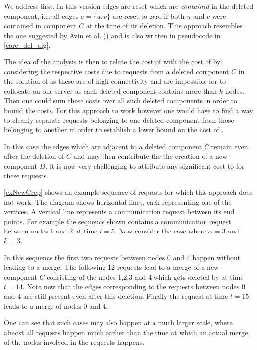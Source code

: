 \documentclass[a4paper,xcolor=dvipsnames, tikz, 12pt]{article}
\newcommand{\opt}{\text{O{\scriptsize PT}}}
\newcommand{\coreDel}{\text{C{\scriptsize ORE}-D{\scriptsize EL}}}
\theoremstyle{definition}
\begin{document}
	 We address \coreDel{} first. In this version edges are reset which are \textit{contained} in the deleted component, i.e. all edges $e=\{u,v\}$ are reset to zero if both $u$ and $v$ were contained in component $C$ at the time of its deletion. This approach resembles the one suggested by Avin et al. (\cite{Avin2015}) and is also written in pseudocode in \cref{core_del_alg}.
	 
	 The idea of the analysis is then to relate the cost of \coreDel{} with the cost of \opt{} by considering the respective costs due to requests from a deleted component $C$ in the solution of \coreDel{} as these are of high connectivity and are impossible for \opt{} to collocate on one server as each deleted component contains more than $k$ nodes. Then one could sum these costs over all such deleted components in order to bound the costs. For this approach to work however one would have to find a way to cleanly separate requests belonging to one deleted component from those belonging to another in order to establish a lower bound on the cost of \opt{}.
	 
	 In this case the edges which are adjacent to a deleted component $C$ remain even after the deletion of $C$ and may then contribute the the creation of a new component $D$. It is now very challenging to attribute any significant cost to \opt{} for these requests.
	 
	 \cref{exNewCrep} shows an example sequence of requests for which this approach does not work. The diagram shows horizontal lines, each representing one of the vertices. A vertical line represents a communication request between its end points. For example the sequence shown contains a communication request between nodes 1 and 2 at time $t=5$. Now consider the case where $\alpha=3$ and $k=3$.
	 
	 In this sequence the first two requests between nodes 0 and 4 happen without leading to a merge. The following 12 requests lead to a merge of a new component $C$ consisting of the nodes 1,2,3 and 4 which gets deleted by \coreDel{} at time $t=14$. Note now that the edges corresponding to the requests between nodes 0 and 4 are still present even after this deletion. Finally the request at time $t=15$ leads to a merge of nodes 0 and 4.
	 
	 One can see that such cases may also happen at a much larger scale, where almost all requests happen much earlier than the time at which an actual merge of the nodes involved in the requests happens.
	 
\end{document}
